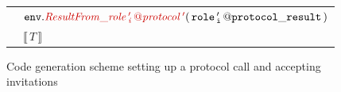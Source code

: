 \documentclass[12pt,twoside]{report}
\begin{document}
\begin{figure}[!h]
\begin{center}
\begin{tabular}{l}
            {\footnotesize
            $\quad \methodcall{\envparam}{ResultFrom\_\localprotocol{role\,'_i\,}{protocol\,'}}\params{\varname{role\,'_i\,@protocol\_result}}$}\\[3pt]
            
            {\footnotesize
            $\quad \llbracket\,T\,\rrbracket$}
        \end{tabular}
    \end{center}
    \caption{Code generation scheme setting up a protocol call and accepting invitations}
    \label{protocol-setup-codegen}
\end{figure}

            

            


            

\end{document}
